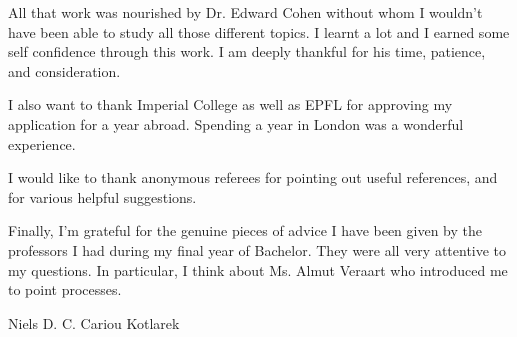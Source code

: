 \begin{acknowledgements}




All that work was nourished by Dr. Edward Cohen without whom I wouldn't have been able to study all those different topics. I learnt a lot and I earned some self confidence through this work. I am deeply thankful for his time, patience, and consideration. 

I also want to thank Imperial College as well as EPFL for approving my application for a year abroad. Spending a year in London was a wonderful experience.

I would like to thank anonymous referees for pointing out useful references, and for various helpful suggestions. 

Finally, I’m grateful for the genuine pieces of advice I have been given by the professors I had during my final year of Bachelor. They were all very attentive to my questions. In particular, I think about Ms. Almut Veraart who introduced me to point processes.

Niels D. C. Cariou Kotlarek







\end{acknowledgements}
